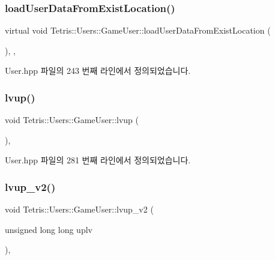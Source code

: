 \subsubsection{\texorpdfstring{load\+User\+Data\+From\+Exist\+Location()}{loadUserDataFromExistLocation()}}
{\footnotesize\ttfamily virtual void Tetris\+::\+Users\+::\+Game\+User\+::load\+User\+Data\+From\+Exist\+Location (\begin{DoxyParamCaption}{ }\end{DoxyParamCaption})\hspace{0.3cm}{\ttfamily [inline]}, {\ttfamily [protected]}, {\ttfamily [virtual]}}



User.\+hpp 파일의 243 번째 라인에서 정의되었습니다.

\mbox{\label{class_tetris_1_1_users_1_1_game_user_ad7bdfbb3fc18ca0a1cdfcb34faaed6ff}} 
\subsubsection{\texorpdfstring{lvup()}{lvup()}}
{\footnotesize\ttfamily void Tetris\+::\+Users\+::\+Game\+User\+::lvup (\begin{DoxyParamCaption}{ }\end{DoxyParamCaption})\hspace{0.3cm}{\ttfamily [inline]}, {\ttfamily [protected]}}



User.\+hpp 파일의 281 번째 라인에서 정의되었습니다.

\mbox{\label{class_tetris_1_1_users_1_1_game_user_aacc605ed22d2b982a106659ef94fb3c9}} 
\subsubsection{\texorpdfstring{lvup\+\_\+v2()}{lvup\_v2()}}
{\footnotesize\ttfamily void Tetris\+::\+Users\+::\+Game\+User\+::lvup\+\_\+v2 (\begin{DoxyParamCaption}\item[{unsigned long long}]{uplv }\end{DoxyParamCaption})\hspace{0.3cm}{\ttfamily [inline]}, {\ttfamily [protected]}}



